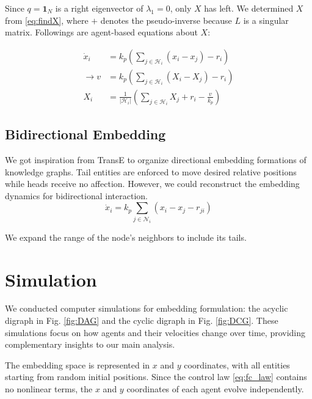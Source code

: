 \documentclass[letterpaper, 10 pt, conference]{ieeeconf}  %
\begin{document}
Since $q=\mathbf{1}_N$ is a right eigenvector of $\lambda_1 = 0$, only $X$ has left. We determined \( X \) from \eqref{eq:findX}, where \( + \) denotes the pseudo-inverse because \( L \) is a singular matrix. Followings are agent-based equations about $X$:

\begin{equation}
\begin{split}
\dot{x}_i &= k_p(\sum_{j \in \mathcal{H}_i} (x_i - x_j) -r_i) \\
\rightarrow v &= k_p(\sum_{j \in \mathcal{H}_i} (X_i - X_j) - r_i) \\
X_i &= \frac{1}{|\mathcal{H}_i|}(\sum_{j \in \mathcal{H}_i} X_j +r_i-\frac{v}{k_p})
\end{split}
\end{equation}

\subsection{Bidirectional Embedding}
We got inspiration from TransE to organize directional embedding formations of knowledge graphs. Tail entities are enforced to move desired relative positions while heads receive no affection. However, we could 
reconstruct the embedding dynamics for bidirectional interaction. 
\begin{equation}
    \dot{x}_i = k_p \sum_{j \in \mathcal{N}_i} (x_i - x_j - r_{ji})
\end{equation}

We expand the range of the node's neighbors to include its tails. 

\section{Simulation}
We conducted computer simulations for embedding formulation: the acyclic digraph in Fig. \ref{fig:DAG} and the cyclic digraph in Fig. \ref{fig:DCG}. These simulations focus on how agents and their velocities change over time, providing complementary insights to our main analysis.

The embedding space is represented in $x$ and $y$ coordinates, with all entities starting from random initial positions. Since the control law \eqref{eq:fc_law} contains no nonlinear terms, the $x$ and $y$ coordinates of each agent evolve independently. %
\end{document}
